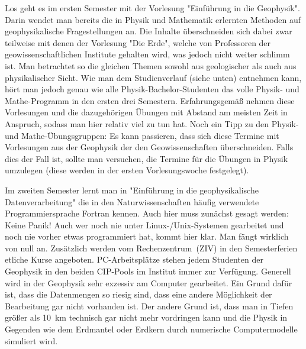 \begin{multicols}{2}
Los geht es im ersten Semester mit der Vorlesung "Einführung in die Geophysik".
Darin wendet man bereits die in Physik und Mathematik erlernten Methoden auf geophysikalische Fragestellungen an.
Die Inhalte überschneiden sich dabei zwar teilweise mit denen der Vorlesung "Die Erde", welche von Professoren der geowissenschaftlichen Institute gehalten wird, was jedoch nicht weiter schlimm ist.
Man betrachtet so die gleichen Themen sowohl aus geologischer als auch aus physikalischer Sicht.
Wie man dem Studienverlauf (siehe unten) entnehmen kann, hört man jedoch genau wie alle Physik-Bachelor-Studenten das volle Physik- und Mathe-Programm in den ersten drei Semestern.
Erfahrungsgemäß nehmen diese Vorlesungen und die dazugehörigen Übungen mit Abstand am meisten Zeit in Anspruch, sodass man hier relativ viel zu tun hat.
Noch ein Tipp zu den Physik- und Mathe-Übungsgruppen: Es kann passieren, dass sich diese Termine mit Vorlesungen aus der Geophysik der den Geowissenschaften überschneiden.
Falls dies der Fall ist, sollte man versuchen, die Termine für die Übungen in Physik umzulegen (diese werden in der ersten Vorlesungswoche festgelegt).

Im zweiten Semester lernt man in "Einführung in die geophysikalische Datenverarbeitung" die in den Naturwissenschaften häufig verwendete Programmiersprache Fortran kennen.
Auch hier muss zunächst gesagt werden: Keine Panik! Auch wer noch nie unter Linux-/Unix-Systemen gearbeitet und noch nie vorher etwas programmiert hat, kommt hier klar.
Man fängt wirklich von null an.
Zusätzlich werden vom Rechenzentrum~(ZIV) in den Semesterferien etliche Kurse angeboten.
PC-Arbeitsplätze stehen jedem Studenten der Geophysik in den beiden CIP-Pools im Institut immer zur Verfügung.
Generell wird in der Geophysik sehr exzessiv am Computer gearbeitet.
Ein Grund dafür ist, dass die Datenmengen so riesig sind, dass eine andere Möglichkeit der Bearbeitung gar nicht vorhanden ist.
Der andere Grund ist, dass man in Tiefen größer als \SI{10}{\km} technisch gar nicht mehr vordringen kann und die Physik in Gegenden wie dem Erdmantel oder Erdkern durch numerische Computermodelle simuliert wird.


\end{multicols}
